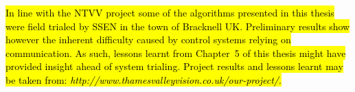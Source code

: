\hl{In line with the NTVV project some of the algorithms presented in this thesis were field trialed by SSEN in the town of Bracknell UK. Preliminary results show however the inherent difficulty caused by control systems relying on communication. As such, lessons learnt from Chapter~5 of this thesis might have provided insight ahead of system trialing. Project results and lessons learnt may be taken from: \textit{http://www.thamesvalleyvision.co.uk/our-project/}.}



